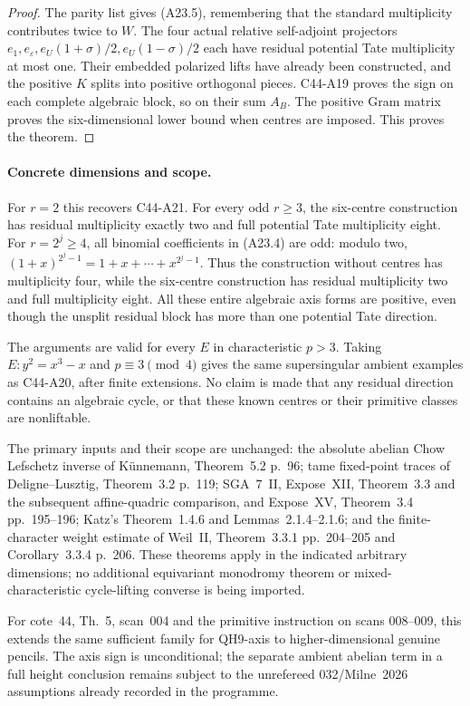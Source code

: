 \documentclass[11pt]{article}
\theoremstyle{remark}\newtheorem{remark}[theorem]{Remark}
\begin{document}
\begin{proof}
The parity list gives (A23.5), remembering that the standard
multiplicity contributes twice to $W$.  The four actual relative
self-adjoint projectors
$e_1,e_\varepsilon,e_U(1+\sigma)/2,e_U(1-\sigma)/2$
each have residual potential Tate multiplicity at most one.
Their embedded polarized lifts have already been constructed, and
the positive $K$ splits into positive orthogonal pieces.
C44-A19 proves the sign on each complete algebraic block, so on their
sum $A_B$.  The positive Gram matrix proves the six-dimensional
lower bound when centres are imposed.  This proves the theorem.
\end{proof}

\paragraph{Concrete dimensions and scope.}
For $r=2$ this recovers C44-A21.  For every odd $r\geq3$, the six-centre
construction has residual multiplicity exactly two and full potential
Tate multiplicity eight.  For $r=2^j\geq4$, all binomial coefficients
in (A23.4) are odd: modulo two,
$(1+x)^{2^j-1}=1+x+\cdots+x^{2^j-1}$.
Thus the construction without centres has multiplicity four, while
the six-centre construction has residual multiplicity two and full
multiplicity eight.  All these entire algebraic axis forms are
positive, even though the unsplit residual block has more than one
potential Tate direction.

The arguments are valid for every $E$ in characteristic $p>3$.
Taking $E:y^2=x^3-x$ and $p\equiv3\pmod4$ gives the same supersingular
ambient examples as C44-A20, after finite extensions.  No claim is made
that any residual direction contains an algebraic cycle, or that these
known centres or their primitive classes are nonliftable.

The primary inputs and their scope are unchanged: the absolute abelian
Chow Lefschetz inverse of K\"unnemann, Theorem~5.2 p.~96; tame
fixed-point traces of Deligne--Lusztig, Theorem~3.2 p.~119; SGA~7~II,
Expose~XII, Theorem~3.3 and the subsequent affine-quadric comparison,
and Expose~XV, Theorem~3.4 pp.~195--196; Katz's Theorem~1.4.6 and
Lemmas~2.1.4--2.1.6; and the finite-character weight estimate of
Weil~II, Theorem~3.3.1 pp.~204--205 and Corollary~3.3.4 p.~206.
These theorems apply in the indicated arbitrary dimensions; no
additional equivariant monodromy theorem or mixed-characteristic
cycle-lifting converse is being imported.

For cote~44, Th.~5, scan~004 and the primitive instruction on scans
008--009, this extends the same sufficient family for QH9-axis to
higher-dimensional genuine pencils.  The axis sign is unconditional;
the separate ambient abelian term in a full height conclusion remains
subject to the unrefereed 032/Milne~2026 assumptions already recorded
in the programme.
\end{document}
